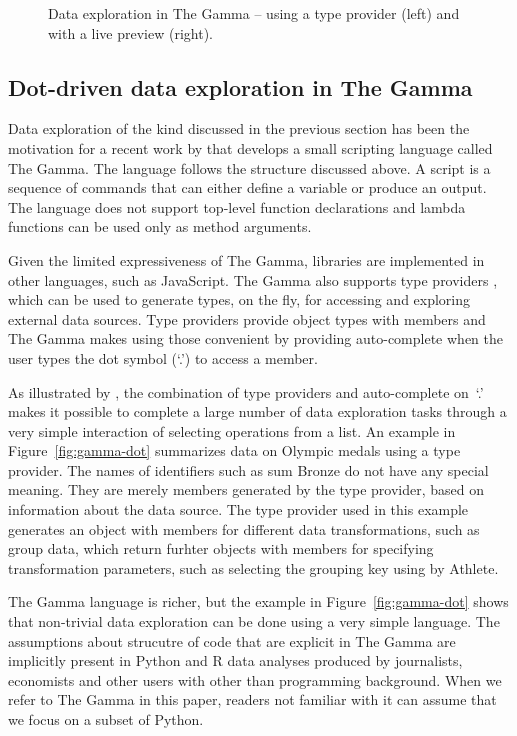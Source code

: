 \documentclass[acmsmall,anonymous,fleqn]{acmart}\settopmatter{printfolios=false,printccs=false,printacmref=false}
\theoremstyle{plain}
\theoremstyle{definition}
\newcommand{\qident}[1]{\textnormal{\sffamily \textquotesingle #1\textquotesingle}}
\begin{document}
\begin{figure}[b]
  \caption{\small Data exploration in The Gamma -- using a type provider (left) and with a live
    preview (right).}
  \label{first-figure-with-subfigures}
\end{figure}

\subsection{Dot-driven data exploration in The Gamma}
\label{sec:background-gamma}

Data exploration of the kind discussed in the previous section has been the motivation for a
recent work by \citet{gamma} that develops a small scripting language called The Gamma. The language
follows the structure discussed above. A script is a sequence of commands that can either define a
variable or produce an output. The language does not support top-level function declarations
and lambda functions can be used only as method arguments.

Given the limited expressiveness of The Gamma, libraries are implemented in other languages,
such as JavaScript. The Gamma also supports type providers \cite{providers-fsharp},
which can be used to generate types, on the fly, for accessing and exploring external data sources.
Type providers provide object types with members and The Gamma makes using those convenient by
providing auto-complete when the user types the dot symbol (`.') to access a member.

As illustrated by \citet{gamma}, the combination of type providers and auto-complete on~`.' makes it
possible to complete a large number of data exploration tasks through a very simple interaction of
selecting operations from a list. An example in Figure~\ref{fig:gamma-dot} summarizes data on
Olympic medals using a type provider. The names of identifiers such as \qident{sum Bronze} do not have
any special meaning. They are merely members generated by the type provider, based on information
about the data source. The type provider used in this example generates an object with members for
different data transformations, such as \qident{group data}, which return furhter objects with
members for specifying transformation parameters, such as selecting the grouping key using
\qident{by Athlete}.

The Gamma language is richer, but the example in Figure~\ref{fig:gamma-dot} shows that non-trivial
data exploration can be done using a very simple language. The assumptions about strucutre of
code that are explicit in The Gamma are implicitly present in Python and R data analyses
produced by journalists, economists and other users with other than programming background.
When we refer to The Gamma in this paper, readers not familiar with it can assume that we focus
on a subset of Python.
\end{document}
